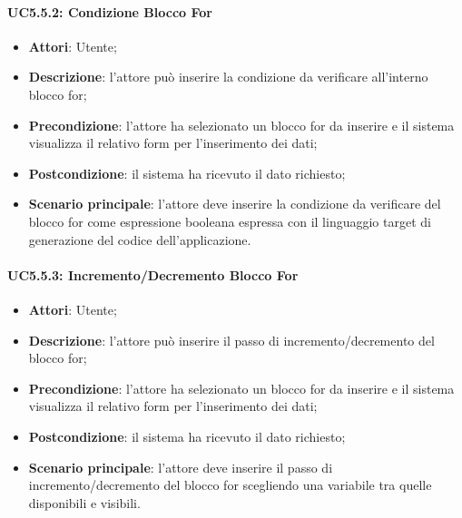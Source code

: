 \begin{itemize}
\begin{itemize}
\begin{itemize}
\begin{itemize}
\paragraph{UC5.5.2: Condizione Blocco For}
\label{UC5.5.2}
\begin{itemize}
	\item \textbf{Attori}: Utente;
	\item \textbf{Descrizione}: l'attore può inserire la condizione da verificare all'interno blocco for;
	\item \textbf{Precondizione}: l'attore ha selezionato un blocco for da inserire e il sistema visualizza il relativo form per l'inserimento dei dati;
	\item \textbf{Postcondizione}: il sistema ha ricevuto il dato richiesto;
	\item \textbf{Scenario principale}: l'attore deve inserire la condizione da verificare del blocco for come espressione booleana espressa con il linguaggio target di generazione del codice dell'applicazione.
\end{itemize}

\paragraph{UC5.5.3: Incremento/Decremento Blocco For}
\label{UC5.5.3}
\begin{itemize}
	\item \textbf{Attori}: Utente;
	\item \textbf{Descrizione}: l'attore può inserire il passo di incremento/decremento del blocco for;
	\item \textbf{Precondizione}: l'attore ha selezionato un blocco for da inserire e il sistema visualizza il relativo form per l'inserimento dei dati;
	\item \textbf{Postcondizione}: il sistema ha ricevuto il dato richiesto;
	\item \textbf{Scenario principale}: l'attore deve inserire il passo di incremento/decremento del blocco for scegliendo una variabile tra quelle disponibili e visibili.
\end{itemize}


\end{itemize}
\end{itemize}
\end{itemize}
\end{itemize}
